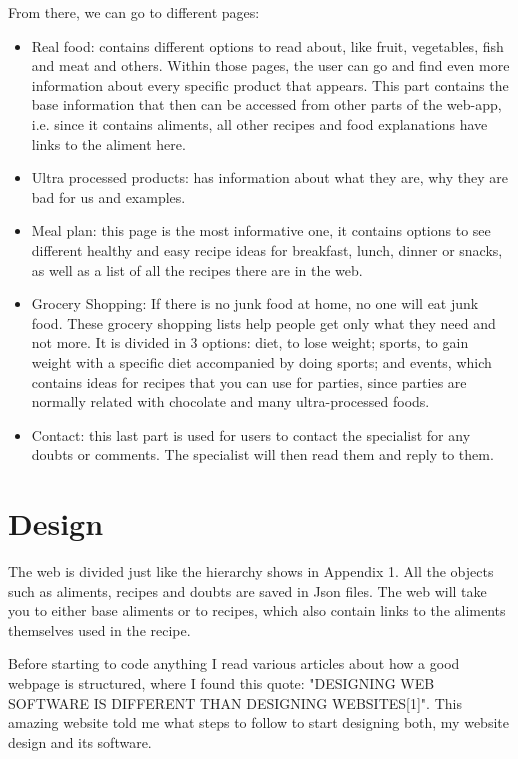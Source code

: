 \documentclass[10pt, a4paper]{article}
\begin{document}
    From there, we can go to different pages:
    \begin{itemize}
        \item Real food: contains different options to read about, like fruit, vegetables, fish and meat and others. Within those pages, the user can go and find even more information about every specific product that appears. This part contains the base information that then can be accessed from other parts of the web-app, i.e. since it contains aliments, all other recipes and food explanations have links to the aliment here.
        \item Ultra processed products: has information about what they are, why they are bad for us and examples.
        \item Meal plan: this page is the most informative one, it contains options to see different healthy and easy recipe ideas for breakfast, lunch, dinner or snacks, as well as a list of all the recipes there are in the web.
        \item Grocery Shopping: If there is no junk food at home, no one will eat junk food. These grocery shopping lists help people get only what they need and not more. It is divided in 3 options: diet, to lose weight; sports, to gain weight with a specific diet accompanied by doing sports; and events, which contains ideas for recipes that you can use for parties, since parties are normally related with chocolate and many ultra-processed foods.
        \item Contact: this last part is used for users to contact the specialist for any doubts or comments. The specialist will then read them and reply to them.
    \end{itemize}


    \section{Design}

    The web is divided just like the hierarchy shows in Appendix 1. All the objects such as aliments, recipes and doubts are saved in Json files. The web will take you to either base aliments or to recipes, which also contain links to the aliments themselves used in the recipe.

    Before starting to code anything I read various articles about how a good webpage is structured, where I found this quote: "DESIGNING WEB SOFTWARE IS DIFFERENT THAN DESIGNING WEBSITES[1]". This amazing website told me what steps to follow to start designing both, my website design and its software.
\end{document}
